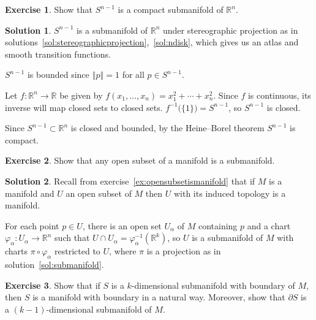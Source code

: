 \documentclass[11pt, a4paper]{report}
\theoremstyle{definition}
\newtheorem{ex}{Exercise}[part]
\newtheorem{sol}{Solution}[part]
\newcommand*{\norm}[1]{\ensuremath{\left\Vert#1\right\Vert}}
\begin{document}
\begin{ex}

Show that $S^{n - 1}$ is a compact submanifold of $\mathbb{R}^n$.

\end{ex}

\begin{sol}

$S^{n - 1}$ is a submanifold of $\mathbb{R}^n$ under stereographic projection as in solutions~\ref{sol:stereographicprojection},~\ref{sol:ndisk}, which gives us an atlas and smooth transition functions.

$S^{n - 1}$ is bounded since $\norm{p} = 1$ for all $p \in S^{n - 1}$.

Let $f: \mathbb{R}^n \to \mathbb{R}$ be given by $f(x_1, \ldots, x_n) = x_1^2 + \cdots + x_n^2$. Since $f$ is continuous, its inverse will map closed sets to closed sets. $f^{-1}\bigl(\{1\}\bigr) = S^{n - 1}$, so $S^{n - 1}$ is closed.

Since $S^{n - 1} \subset \mathbb{R}^n$ is closed and bounded, by the Heine--Borel theorem $S^{n - 1}$ is compact.

\end{sol}

\begin{ex}

Show that any open subset of a manifold is a submanifold.

\end{ex}

\begin{sol}

Recall from exercise~\ref{ex:opensubsetismanifold} that if $M$ is a manifold and $U$ an open subset of $M$ then $U$ with its induced topology is a manifold.

For each point $p \in U$, there is an open set $U_\alpha$ of $M$ containing $p$ and a chart $\varphi_\alpha: U_\alpha \to \mathbb{R}^n$ such that $U \cap U_\alpha = \varphi_\alpha^{-1}(\mathbb{R}^k)$, so $U$ is a submanifold of $M$ with charts $\pi \circ \varphi_\alpha$ restricted to $U$, where $\pi$ is a projection as in solution~\ref{sol:submanifold}.

\end{sol}

\begin{ex}

Show that if $S$ is a $k$-dimensional submanifold with boundary of $M$, then $S$ is a manifold with boundary in a natural way.
Moreover, show that $\partial S$ is a $(k - 1)$-dimensional submanifold of $M$.

\end{ex}
\end{document}
